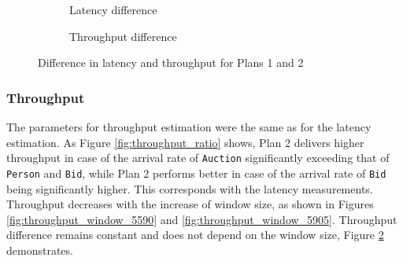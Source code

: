 \begin{figure}[!ht]
    \centering
    \begin{subfigure}[b]{0.45\textwidth}
            
            \captionsetup{justification=justified}
            \caption{Latency difference}
            \label{fig:latency_diff_against_window_size}
    \end{subfigure}
    \hspace{1.25mm}
    \begin{subfigure}[b]{0.45\textwidth}
        
        \captionsetup{justification=justified}
        \caption{Throughput difference}
        \label{fig:throughput_diff_against_window_size}
    \end{subfigure}
    \caption{Difference in latency and throughput for Plans 1 and 2}
    \label{fig:latency_and_throughput_difference}
\end{figure}

\subsubsection{Throughput}

The parameters for throughput estimation were the same as for the latency estimation. As Figure \ref{fig:throughput_ratio} shows, Plan 2 delivers higher throughput in case of the arrival rate of \texttt{Auction} significantly exceeding that of \texttt{Person} and \texttt{Bid}, while Plan 2 performs better in case of the arrival rate of \texttt{Bid} being significantly higher. This corresponds with the latency measurements. Throughput decreases with the increase of window size, as shown in Figures \ref{fig:throughput_window_5590} and \ref{fig:throughput_window_5905}. Throughput difference remains constant and does not depend on the window size, Figure \ref{fig:throughput_diff_against_window_size} demonstrates.

